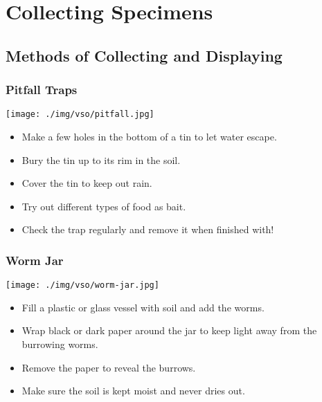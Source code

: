 \chapter{Collecting Specimens} %


\section{Methods of Collecting and Displaying}

\begin{multicols}{2}

\subsection{Pitfall Traps}

\begin{center}
\texttt{[image: ./img/vso/pitfall.jpg]}
\end{center}

\begin{itemize}
\item Make a few holes in the bottom
of a tin to let water escape.
\item Bury the tin up to its rim in the
soil.
\item Cover the tin to keep out rain.
\item Try out different types of food
as bait.
\item Check the trap regularly and
remove it when finished with!
\end{itemize}


\subsection{Worm Jar}

\begin{center}
\texttt{[image: ./img/vso/worm-jar.jpg]}
\end{center}

\begin{itemize}
\item Fill a plastic or glass vessel with soil and add the worms.
\item Wrap black or dark paper
around the jar to keep light
away from the burrowing
worms.
\item Remove the paper to reveal the
burrows.
\item Make sure the soil is kept moist
and never dries out.
\end{itemize}



\end{multicols}

